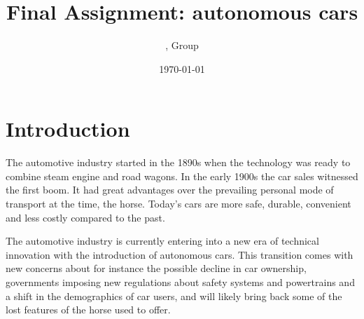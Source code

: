 \documentclass[a4paper]{article}
\title{Final Assignment: autonomous cars}
\author{\censor{Erik Wouters}, Group \censor{13}}
\date{\today}
\begin{document}
\maketitle


\section{Introduction}
\label{sec:introduction}

The automotive industry started in the 1890s when the technology was ready to combine steam engine and road wagons. In the early 1900s the car sales witnessed the first boom. It had great advantages over the prevailing personal mode of transport at the time, the horse. Today's cars are more safe, durable, convenient and less costly compared to the past.

The automotive industry is currently entering into a new era of technical innovation with the introduction of autonomous cars. This transition comes with new concerns about for instance the possible decline in car ownership, governments imposing new regulations about safety systems and powertrains and a shift in the demographics of car users, and will likely bring back some of the lost features of the horse used to offer.
\end{document}
